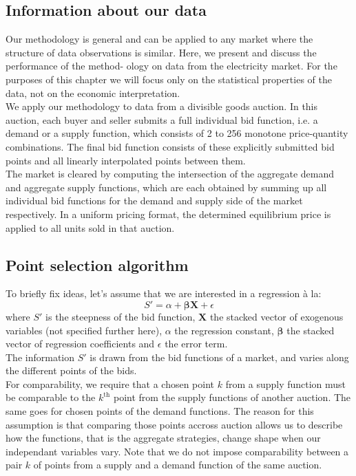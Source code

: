 \subsection{Information about our data}\label{gleinfo}

Our methodology is general and can be applied to any market where the structure of data observations is similar. Here, we present and discuss the performance of the method- ology on data from the electricity market. For the purposes of this chapter we will focus only on the statistical properties of the data, not on the economic interpretation.\\

We apply our methodology to data from a divisible goods auction. In this auction, each buyer and seller submits a full individual bid function, i.e. a demand or a supply function, which consists of 2 to 256 monotone price-quantity combinations. The final bid function consists of these explicitly submitted bid points and all linearly interpolated points between them.\\

The market is cleared by computing the intersection of the aggregate demand and aggregate supply functions, which are each obtained by summing up all individual bid functions for the demand and supply side of the market respectively. In a uniform pricing format, the determined equilibrium price is applied to all units sold in that auction.


\subsection{Point selection algorithm}\label{pointselect}

To briefly fix ideas, let's assume that we are interested in a regression \`{a} la: 
$$ S' = \alpha + \boldsymbol{\beta  X} + \epsilon$$
where $S'$ is the steepness of the bid function, $\boldsymbol{X}$ the stacked vector of exogenous variables (not specified further here), $\alpha$ the regression constant, $\boldsymbol{\beta}$ the stacked vector of regression coefficients and $\epsilon$ the error term. \\

The information $S'$ is drawn from the bid functions of a %
market, and varies along the different points of the bids.\\

For comparability, we require that a chosen point $k$ from a supply function must be comparable to the $k^\text{th}$ point from the supply functions of another auction. The same goes for chosen points of the demand functions. The reason for this assumption is that comparing those points accross auction allows us to describe how the functions, that is the aggregate strategies, change shape when our independant variables vary. Note that we do not impose comparability between a pair $k$ of points from a supply and a demand function of the same auction. 

